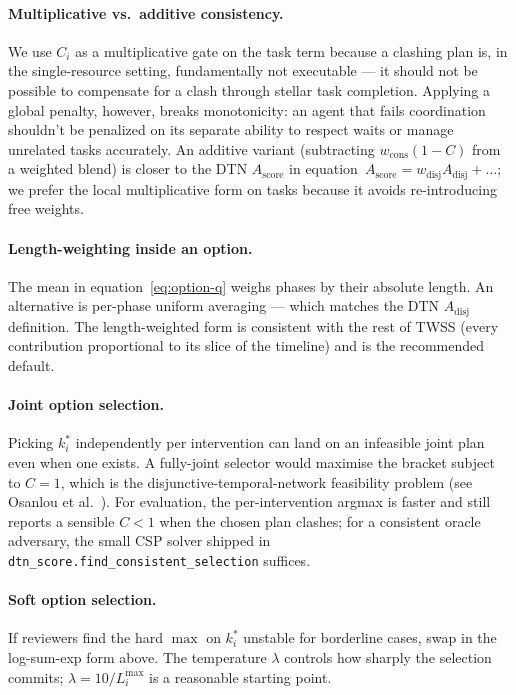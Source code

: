 \documentclass[11pt]{article}
\newcommand{\Score}{A_{\text{score}}}
\begin{document}
\paragraph{Multiplicative vs.\ additive consistency.} We use $C_i$ as a
multiplicative gate on the task term because a clashing plan is, in
the single-resource setting, fundamentally not executable --- it
should not be possible to compensate for a clash through stellar
task completion. Applying a global penalty, however, breaks monotonicity: 
an agent that fails coordination shouldn't be penalized on its separate ability 
to respect waits or manage unrelated tasks accurately. An additive variant (subtracting $w_{\text{cons}}(1 - C)$
from a weighted blend) is closer to the DTN $\Score$ in
equation~$\Score = w_{\text{disj}}A_{\text{disj}} + \dots$; we prefer the
local multiplicative form on tasks because it avoids re-introducing free weights.

\paragraph{Length-weighting inside an option.} The mean in
equation~\eqref{eq:option-q} weighs phases by their absolute length.
An alternative is per-phase uniform averaging --- which matches the
DTN $A_{\text{disj}}$ definition. The length-weighted form is consistent with
the rest of TWSS (every contribution proportional to its slice of
the timeline) and is the recommended default.

\paragraph{Joint option selection.} Picking $k^*_i$ independently per
intervention can land on an infeasible joint plan even when one
exists. A fully-joint selector would maximise the bracket subject to
$C = 1$, which is the disjunctive-temporal-network feasibility
problem (see Osanlou et al.~\cite{osanlou2022dtnu}). For evaluation,
the per-intervention argmax is faster and still reports a sensible
$C < 1$ when the chosen plan clashes; for a consistent oracle
adversary, the small CSP solver shipped in
\texttt{dtn\_score.find\_consistent\_selection} suffices.

\paragraph{Soft option selection.} If reviewers find the hard $\max$
on $k^*_i$ unstable for borderline cases, swap in the log-sum-exp
form above. The temperature $\lambda$ controls how sharply the
selection commits; $\lambda = 10/L_i^{\max}$ is a reasonable starting
point.
\end{document}
